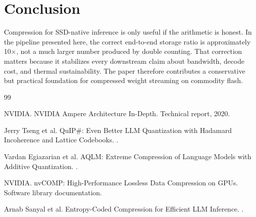 \documentclass[11pt]{article}
\begin{document}
\section{Conclusion}
Compression for SSD-native inference is only useful if the arithmetic is honest. In the pipeline presented here, the correct end-to-end storage ratio is approximately 10$\times$, not a much larger number produced by double counting. That correction matters because it stabilizes every downstream claim about bandwidth, decode cost, and thermal sustainability. The paper therefore contributes a conservative but practical foundation for compressed weight streaming on commodity flash.

\begin{thebibliography}{99}

NVIDIA.
\newblock NVIDIA Ampere Architecture In-Depth.
\newblock Technical report, 2020.

Jerry Tseng et al.
\newblock QuIP\#: Even Better LLM Quantization with Hadamard Incoherence and Lattice Codebooks.
.

Vardan Egiazarian et al.
\newblock AQLM: Extreme Compression of Language Models with Additive Quantization.
.

NVIDIA.
\newblock nvCOMP: High-Performance Lossless Data Compression on GPUs.
\newblock Software library documentation.

Arnab Sanyal et al.
\newblock Entropy-Coded Compression for Efficient LLM Inference.
.

\end{thebibliography}
\end{document}

